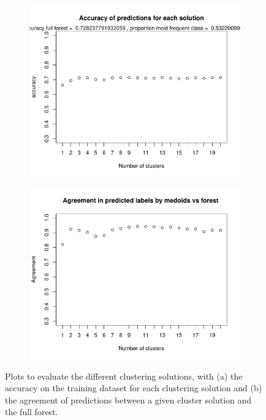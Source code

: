 \begin{figure}[H]
	\centering
	\begin{subfigure}[t]{.49\textwidth}
		\centering
		\captionsetup{justification=centering}
		\includegraphics[width=\linewidth, trim=0 0 0 2.02cm, clip]{accuracy}
		\caption{}	
	\end{subfigure}%
	\begin{subfigure}[t]{.49\textwidth}
		\centering
		\captionsetup{justification=centering}
	\includegraphics[width=\linewidth, trim=0 0 0 2.02cm, clip]{agreement}
		\caption{}
	\end{subfigure}
		\caption{Plots to evaluate the different clustering solutions, with (a) the accuracy on the training dataset for each clustering solution and (b) the agreement of predictions between a given cluster solution and the full forest. }
	\label{fig:Ex2Measures}
\end{figure}



